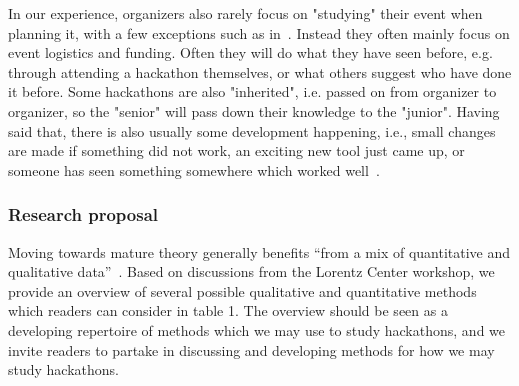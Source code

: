 \documentclass{ieeeaccess}
\begin{document}
In our experience, organizers also rarely focus on "studying" their event when planning it, with a few exceptions such as in~\cite{pe2019hackathons}. 
Instead they often mainly focus on event logistics and funding.
Often they will do what they have seen before, e.g. through attending a hackathon themselves, or what others suggest who have done it before. 
Some hackathons are also "inherited", i.e. passed on from organizer to organizer, so the "senior" will pass down their knowledge to the "junior". 
Having said that, there is also usually some development happening, i.e., small changes are made if something did not work, an exciting new tool just came up, or someone has seen something somewhere which worked well~\cite{powell2021organizing}.

\subsubsection{Research proposal}
Moving towards mature theory generally benefits ``from a mix of quantitative and qualitative data''~\cite{edmondson2007methodological}.
Based on discussions from the Lorentz Center workshop, we provide an overview of several possible qualitative and quantitative methods which readers can consider in table 1.
The overview should be seen as a developing repertoire of methods which we may use to study hackathons, and we invite readers to partake in discussing and developing methods for how we may study hackathons.
\end{document}
